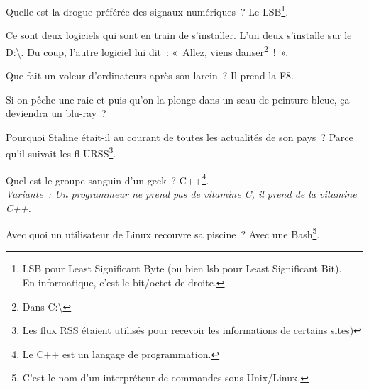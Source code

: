 \documentclass[10pt,a5paper,fullpage]{book}
\begin{document}
\begin{enumerate}
{		%
		\item Quelle est la drogue préférée des signaux numériques~? Le LSB\footnote{LSB pour Least Significant Byte (ou bien lsb pour Least Significant Bit). \\En informatique, c’est le bit/octet de droite.}.
		\item Ce sont deux logiciels qui sont en train de s’installer. L’un deux s’installe sur le D:\textbackslash. Du coup, l’autre logiciel lui dit~: « Allez, viens danser\footnote{Dans C:\textbackslash}~! ».
		\item Que fait un voleur d’ordinateurs après son larcin~? Il prend la F8.
		\item Si on pêche une raie et puis qu’on la plonge dans un seau de peinture bleue, ça deviendra un blu-ray~?
		\item Pourquoi Staline était-il au courant de toutes les actualités de son pays~? Parce qu’il suivait les fl-URSS\footnote{Les flux RSS étaient utilisés pour recevoir les informations de certains sites)}.
		\item Quel est le groupe sanguin d’un geek~? C++\footnote{Le C++ est un langage de programmation.}.
		\\\textit{\underline{Variante}~: Un programmeur ne prend pas de vitamine C, il prend de la vitamine C++.}
		\item Avec quoi un utilisateur de Linux recouvre sa piscine~? Avec une Bash\footnote{C'est le nom d'un interpréteur de commandes sous Unix/Linux.}.
}
\end{enumerate}
\end{document}
